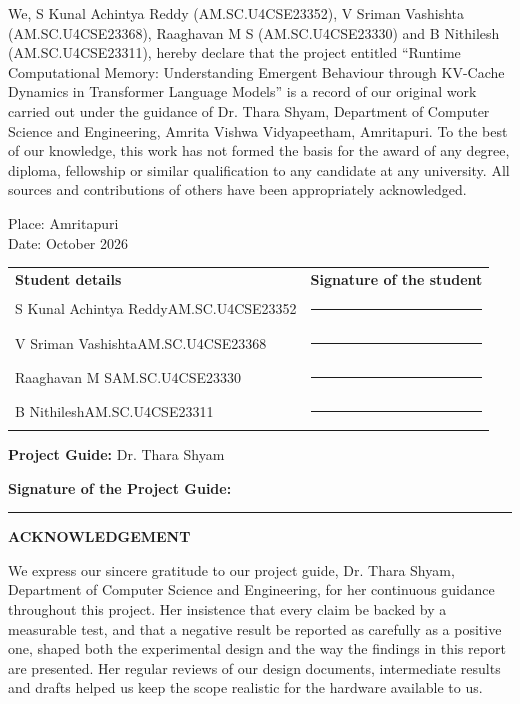 \documentclass[12pt,a4paper,oneside]{report}
\newcommand{\ProjectTitle}{Runtime Computational Memory: Understanding Emergent Behaviour through KV-Cache Dynamics in Transformer Language Models}
\newcommand{\GuideName}{Dr. Thara Shyam}
\newcommand{\GuideLine}{Department of Computer Science and Engineering}
\newcommand{\ReportDate}{October 2026}
\newcommand{\StudentA}{S Kunal Achintya Reddy}\newcommand{\RegA}{AM.SC.U4CSE23352}
\newcommand{\StudentB}{V Sriman Vashishta}\newcommand{\RegB}{AM.SC.U4CSE23368}
\newcommand{\StudentC}{Raaghavan M S}\newcommand{\RegC}{AM.SC.U4CSE23330}
\newcommand{\StudentD}{B Nithilesh}\newcommand{\RegD}{AM.SC.U4CSE23311}
\begin{document}
\vspace{0.3cm}

\begin{sloppypar}\setlength{\rightskip}{0pt plus 2em}\noindent
We, \StudentA{} (\RegA), \StudentB{} (\RegB), \StudentC{} (\RegC) and \StudentD{} (\RegD),
hereby declare that the project entitled
``\ProjectTitle{}'' is a record of our original work
carried out under the guidance of \GuideName, \GuideLine,
Amrita Vishwa Vidyapeetham, Amritapuri.
To the best of our knowledge, this work has not formed the
basis for the award of any degree, diploma, fellowship or
similar qualification to any candidate at any university.
All sources and contributions of others have been
appropriately acknowledged.
\end{sloppypar}

\vspace{0.5cm}

\noindent
Place: Amritapuri\\
Date: \ReportDate

\vspace{0.7cm}

\noindent
\begin{tabular}{@{}p{}p{}@{}}
\textbf{Student details} & \textbf{Signature of the student} \\[8pt]
\StudentA\newline \RegA & \rule{0.30\textwidth}{0.4pt} \\[10pt]
\StudentB\newline \RegB & \rule{0.30\textwidth}{0.4pt} \\[10pt]
\StudentC\newline \RegC & \rule{0.30\textwidth}{0.4pt} \\[10pt]
\StudentD\newline \RegD & \rule{0.30\textwidth}{0.4pt}
\end{tabular}

\vspace{0.5cm}

\noindent
\textbf{Project Guide:} \GuideName

\vspace{0.5cm}

\noindent
\textbf{Signature of the Project Guide:}
\rule{4cm}{0.4pt}

\clearpage
{}
\pagestyle{plain}

{}
{\centering \Large\bfseries ACKNOWLEDGEMENT\par}
\vspace{10pt}
We express our sincere gratitude to our project guide, \GuideName, Department of Computer Science and Engineering, for her continuous guidance throughout this project. Her insistence that every claim be backed by a measurable test, and that a negative result be reported as carefully as a positive one, shaped both the experimental design and the way the findings in this report are presented. Her regular reviews of our design documents, intermediate results and drafts helped us keep the scope realistic for the hardware available to us.
\end{document}
